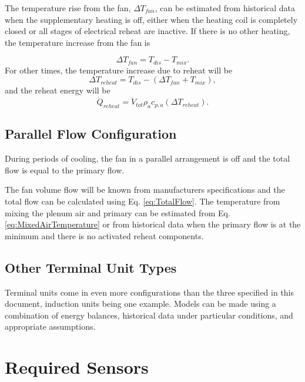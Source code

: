 The temperature rise from the fan, \(\Delta T_{fan}\), can be estimated from
historical data when the supplementary heating is off, either when the heating
coil is completely closed or all stages of electrical reheat are inactive. If
there is no other heating, the temperature increase from the fan is

\begin{equation}
\Delta {T_{fan}} = {T_{dis}} - {T_{mix}}.
\end{equation}
%
For other times, the temperature increase due to reheat will be
%
\begin{equation}
\Delta {T_{reheat}} = {T_{dis}} - \left( {\Delta {T_{fan}} + {T_{mix}}} \right),
\end{equation}
%
and the reheat energy will be
%
\begin{equation}
{\dot Q_{reheat}} = {\dot V_{tot}}{\rho _a}{c_{p,a}}\left( {\Delta {T_{reheat}}} \right).
\end{equation}

\subsection{Parallel Flow Configuration}

During periods of cooling, the fan in a parallel arrangement is off and the
total flow is equal to the primary flow.

The fan volume flow will be known from manufacturers specifications and the
total flow can be calculated using Eq. \eqref{eq:TotalFlow}. The temperature
from mixing the plenum air and primary can be estimated from Eq.
\eqref{eq:MixedAirTemperature} or from historical data when the primary flow is
at the minimum and there is no activated reheat components.

\subsection{Other Terminal Unit Types}

Terminal units come in even more configurations than the three specified
in this document, induction units being one example. Models can be made
using a combination of energy balances, historical data under particular
conditions, and appropriate assumptions. 

\section{Required Sensors}

